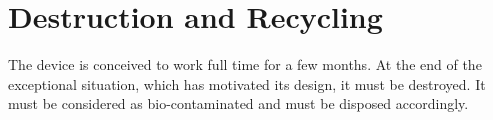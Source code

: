 \section{Destruction and Recycling}
    The device is conceived to work full time for a few months. At the end of the exceptional situation, which has motivated its design, it must be destroyed. It must be considered as bio-contaminated and must be disposed accordingly.
